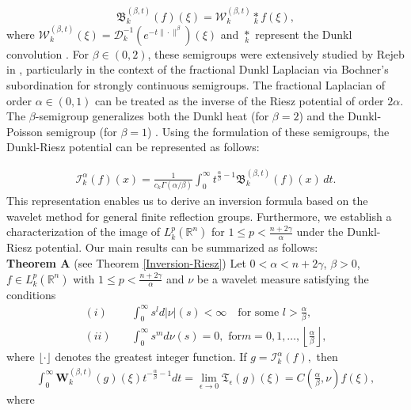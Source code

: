 \documentclass[11pt,a4paper,reqno]{amsproc}
\theoremstyle{definition}
\theoremstyle{remark}
\numberwithin{equation}{section}
\begin{document}
$$\mathfrak{B}_k^{(\beta,t)}(f)(\xi)= \mathcal{W}_k^{(\beta,t)} \underset{k}{\ast} f(\xi),$$ 
where $\mathcal{W}_k^{(\beta,t)}(\xi)=\mathcal{D}_k^{-1}(e^{-t\|\cdot\|^{\beta}})(\xi)$ and $\underset{k}{\ast}$ represent the Dunkl convolution \cite{Thangavelu}. For $\beta\in (0,2)$, these semigroups were extensively studied by Rejeb in \cite{Rejeb}, particularly in the context of the fractional Dunkl Laplacian via Bochner’s subordination for strongly continuous semigroups. The fractional Laplacian of order $\alpha \in (0,1)$ can be treated as the inverse of the Riesz potential of order $2\alpha$. The $\beta$-semigroup generalizes both the Dunkl heat (for $\beta = 2$) and the Dunkl-Poisson semigroup (for $\beta = 1$) \cite{Rosler-98, Thangavelu}. Using the formulation of these semigroups, the Dunkl-Riesz potential can be represented  as follows: 

\begin{align*}
\mathcal{I}_k^\alpha (f)(x) =\frac{1}{c_k\Gamma(\alpha / \beta)} \int_0^{\infty} t^{\frac{\alpha}{\beta}-1} \mathfrak{B}_k^{(\beta, t)} (f)(x)\,dt.
\end{align*} This representation enables us to derive an inversion formula based on the wavelet method for general finite reflection groups. Furthermore, we establish a characterization of the image of $L_k^p(\mathbb{R}^n)$ for $1\leq p < \frac{n+2\gamma}{\alpha}$ under the  Dunkl-Riesz potential. Our main results can be summarized as follows:
\\

\noindent \textbf{Theorem A} (see Theorem \ref{Inversion-Riesz})
     Let $0< \alpha < n+2\gamma$, $\beta >0 $, $f\in L_k^p(\mathbb{R}^n)$ with $1\leq p < \frac{n+2\gamma}{\alpha}$ 
      and $\nu$ be a wavelet measure satisfying the conditions 
      \begin{align*}
          (i)\quad & \int_0^\infty s^{l}d|\nu|(s) < \infty \quad \text{for some }  l > \frac{\alpha}{\beta}, \\
          (ii)\quad  & \int_0^\infty s^m d\nu(s) = 0, \text{ 
 for} m = 0, 1, \ldots, \left\lfloor \frac{\alpha}{\beta} \right\rfloor,
\end{align*}
where \( \lfloor \cdot \rfloor \) denotes the greatest integer function.
     If $g=\mathcal{I}_k^\alpha (f),$ then 
     \begin{align*}
     \int_0^\infty  \mathbf{W}_k^{(\beta,t)}(g)(\xi) t^{-\frac{\alpha}{\beta}-1}dt = \lim_{\epsilon\longrightarrow  0}
       \mathfrak{T}_\epsilon (g)(\xi) =  C\left(\frac{\alpha}{\beta}, \nu\right)f(\xi),
     \end{align*} where 
\end{document}
